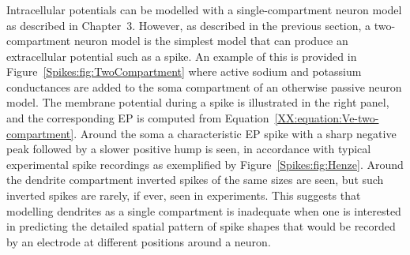 \subsubsection{}
\label{Spikes:sec:EP-spikes-two-compartment}
Intracellular potentials can be modelled with a single-compartment neuron model as described in Chapter~3.
However, as described in the previous section, 
a two-compartment neuron model is the simplest model that can produce an extracellular potential such as a 
spike. An example of this is provided in Figure~\ref{Spikes:fig:TwoCompartment} where active sodium and potassium conductances are added to the  soma compartment of an otherwise passive neuron model. 
The membrane potential during a spike is illustrated in the right panel, and the  
corresponding EP is computed from Equation~\ref{XX:equation:Ve-two-compartment}. Around the soma a characteristic
EP spike with a sharp negative peak followed by a slower positive hump is seen, in accordance with typical experimental
spike recordings as exemplified by Figure~\ref{Spikes:fig:Henze}. Around the dendrite compartment inverted
spikes of the same sizes are seen, but such inverted spikes are rarely, if ever, seen in experiments. This suggests that
modelling dendrites as a single compartment is inadequate when one is interested in predicting the detailed spatial pattern of 
spike shapes that would be recorded by an electrode at different positions around a neuron.                                                                                                                                                                                                                                                                                                                                                                                                                                                                                                                                                                                                                                                                                                                                                                                                                                                                                                                                                                                                                                                                                                                                 

